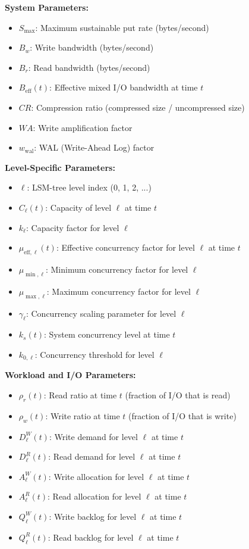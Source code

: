 \documentclass[11pt]{article}
\begin{document}
\textbf{System Parameters:}
\begin{itemize}
    \item $S_{\text{max}}$: Maximum sustainable put rate (bytes/second)
    \item $B_w$: Write bandwidth (bytes/second)
    \item $B_r$: Read bandwidth (bytes/second)
    \item $B_{\text{eff}}(t)$: Effective mixed I/O bandwidth at time $t$
    \item $CR$: Compression ratio (compressed size / uncompressed size)
    \item $WA$: Write amplification factor
    \item $w_{\text{wal}}$: WAL (Write-Ahead Log) factor
\end{itemize}

\textbf{Level-Specific Parameters:}
\begin{itemize}
    \item $\ell$: LSM-tree level index (0, 1, 2, ...)
    \item $C_\ell(t)$: Capacity of level $\ell$ at time $t$
    \item $k_\ell$: Capacity factor for level $\ell$
    \item $\mu_{\text{eff},\ell}(t)$: Effective concurrency factor for level $\ell$ at time $t$
    \item $\mu_{\min,\ell}$: Minimum concurrency factor for level $\ell$
    \item $\mu_{\max,\ell}$: Maximum concurrency factor for level $\ell$
    \item $\gamma_\ell$: Concurrency scaling parameter for level $\ell$
    \item $k_s(t)$: System concurrency level at time $t$
    \item $k_{0,\ell}$: Concurrency threshold for level $\ell$
\end{itemize}

\textbf{Workload and I/O Parameters:}
\begin{itemize}
    \item $\rho_r(t)$: Read ratio at time $t$ (fraction of I/O that is read)
    \item $\rho_w(t)$: Write ratio at time $t$ (fraction of I/O that is write)
    \item $D^W_\ell(t)$: Write demand for level $\ell$ at time $t$
    \item $D^R_\ell(t)$: Read demand for level $\ell$ at time $t$
    \item $A^W_\ell(t)$: Write allocation for level $\ell$ at time $t$
    \item $A^R_\ell(t)$: Read allocation for level $\ell$ at time $t$
    \item $Q^W_\ell(t)$: Write backlog for level $\ell$ at time $t$
    \item $Q^R_\ell(t)$: Read backlog for level $\ell$ at time $t$
\end{itemize}
\end{document}
